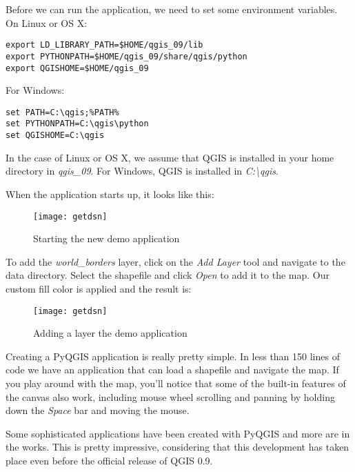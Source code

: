 Before we can run the application, we need to set some environment variables. On Linux or OS X:

\begin{verbatim}
export LD_LIBRARY_PATH=$HOME/qgis_09/lib
export PYTHONPATH=$HOME/qgis_09/share/qgis/python
export QGISHOME=$HOME/qgis_09
\end{verbatim}

For Windows:
\begin{verbatim}
set PATH=C:\qgis;%PATH%
set PYTHONPATH=C:\qgis\python
set QGISHOME=C:\qgis
\end{verbatim}

In the case of Linux or OS X, we assume that QGIS is installed in your home directory in 
\textsl{qgis\_09}. For Windows, QGIS is installed in \textsl{C:\textbackslash qgis}.

When the application starts up, it looks like this:

\begin{figure}[ht]
\begin{center}
  \caption{Starting the new demo application}\label{fig:demo_app_startup}\smallskip
  \texttt{[image: getdsn]}
\end{center}
\end{figure}

To add the \textsl{world\_borders} layer, click on the \textsl{Add Layer} tool and navigate to the data directory.
Select the shapefile and click \textsl{Open} to add it to the map. Our custom fill color is applied and the result is:

\begin{figure}[ht]
\begin{center}
  \caption{Adding a layer the demo application}\label{fig:demo_app_done}\smallskip
  \texttt{[image: getdsn]}
\end{center}
\end{figure}

Creating a PyQGIS application is really pretty simple. In less than 150 lines of code we have an application that can
load a shapefile and navigate the map. If you play around with the map, you'll notice that some of the built-in features
of the canvas also work, including mouse wheel scrolling and panning by holding down the \textsl{Space} bar and
moving the mouse.

Some sophisticated applications have been created with PyQGIS and more are in the works. This is pretty impressive,
considering that this development has taken place even before the official release of QGIS 0.9.

\begin{Tip}\caption{\textsc{Documentation For PyQGIS}}
\end{Tip} 